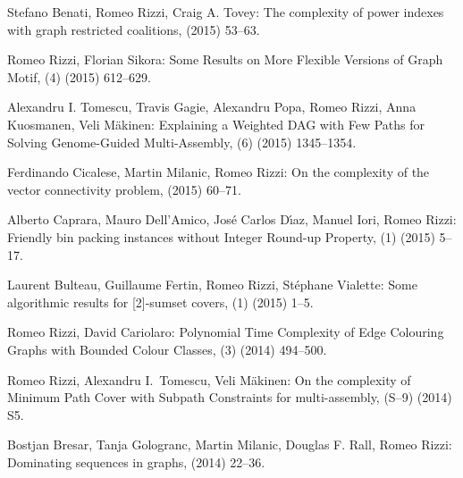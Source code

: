 \begin{etaremune}
  \item {\sc Stefano Benati, Romeo Rizzi, Craig A. Tovey:}
   \newblock The complexity of power indexes with graph restricted coalitions,
    (2015) 53--63.

  \item {\sc Romeo Rizzi, Florian Sikora:}
   \newblock Some Results on More Flexible Versions of Graph Motif,
   (4) (2015) 612--629.

  \item {\sc Alexandru I. Tomescu, Travis Gagie, Alexandru Popa, Romeo Rizzi, Anna Kuosmanen, Veli Mäkinen:}
   \newblock Explaining a Weighted DAG with Few Paths for Solving Genome-Guided Multi-Assembly,
   (6) (2015) 1345--1354.

  \item {\sc Ferdinando Cicalese, Martin Milanic, Romeo Rizzi:}
   \newblock On the complexity of the vector connectivity problem,
    (2015) 60--71.        

  \item {\sc Alberto Caprara, Mauro Dell'Amico, Jos\'e Carlos D\'\i{}az, Manuel Iori, Romeo Rizzi:}
   \newblock Friendly bin packing instances without Integer Round-up Property,
   (1) (2015) 5--17.

  \item {\sc Laurent Bulteau, Guillaume Fertin, Romeo Rizzi, St\'ephane Vialette:}
   \newblock  Some algorithmic results for [2]-sumset covers,
   (1) (2015) 1--5.

  \item {\sc Romeo Rizzi, David Cariolaro:}
   \newblock  Polynomial Time Complexity of Edge Colouring Graphs with Bounded Colour Classes,
   (3) (2014) 494--500.

  \item {\sc Romeo Rizzi, Alexandru I.~Tomescu, Veli M\"akinen:}
   \newblock  On the complexity of Minimum Path Cover with Subpath Constraints for multi-assembly,
   (S--9) (2014) S5.

  \item {\sc Bostjan Bresar, Tanja Gologranc, Martin Milanic, Douglas F. Rall, Romeo Rizzi:}
   \newblock  Dominating sequences in graphs,
    (2014) 22--36.


\end{etaremune}
